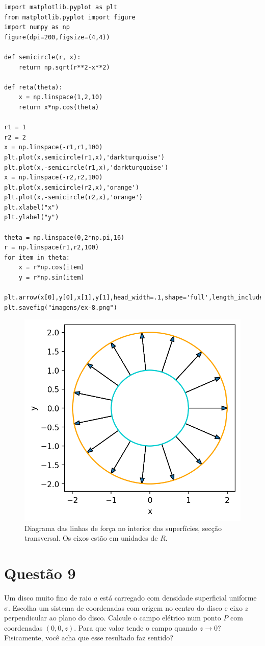 \documentclass[11pt]{article}
\begin{document}
\begin{verbatim}
import matplotlib.pyplot as plt
from matplotlib.pyplot import figure
import numpy as np
figure(dpi=200,figsize=(4,4))

def semicircle(r, x):
    return np.sqrt(r**2-x**2)

def reta(theta):
    x = np.linspace(1,2,10)
    return x*np.cos(theta)

r1 = 1
r2 = 2
x = np.linspace(-r1,r1,100)
plt.plot(x,semicircle(r1,x),'darkturquoise')
plt.plot(x,-semicircle(r1,x),'darkturquoise')
x = np.linspace(-r2,r2,100) 
plt.plot(x,semicircle(r2,x),'orange')
plt.plot(x,-semicircle(r2,x),'orange')
plt.xlabel("x")
plt.ylabel("y")

theta = np.linspace(0,2*np.pi,16)
r = np.linspace(r1,r2,100)
for item in theta:
    x = r*np.cos(item)
    y = r*np.sin(item)
    plt.arrow(x[0],y[0],x[1],y[1],head_width=.1,shape='full',length_includes_head=True)
plt.savefig("imagens/ex-8.png")
\end{verbatim}

\begin{figure}[h!]
  \centering
  \includegraphics{imagens/ex-8.png}
  \caption{Diagrama das linhas de força no interior das superfícies, secção transversal.
  Os eixos estão em unidades de $R$.}
  \label{fig:ex-8-forca}
\end{figure}
\section{Questão 9}
\label{sec:org88406d9}
Um disco muito fino de raio \(a\) está carregado com densidade superficial
uniforme \(\sigma\). Escolha um sistema de coordenadas com origem no centro do
disco e eixo \(z\) perpendicular ao plano do disco. Calcule o campo
elétrico num ponto \(P\) com coordenadas \((0,0,z)\). Para que valor tende o
campo quando \(z\rightarrow0\)? Fisicamente, você acha que esse resultado faz
sentido?
\end{document}
